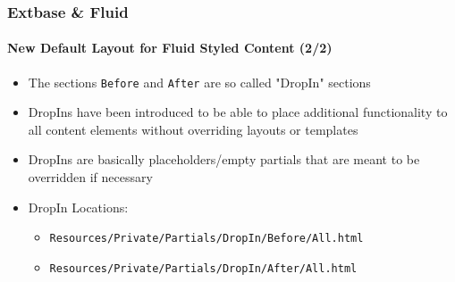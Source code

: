 \begin{frame}[fragile]
	\frametitle{Extbase \& Fluid}
	\framesubtitle{New Default Layout for Fluid Styled Content (2/2)}

	\begin{itemize}
		\item The sections \texttt{Before} and \texttt{After} are so called "DropIn" sections
		\item DropIns have been introduced to be able to place additional functionality to all content
			elements without overriding layouts or templates
		\item DropIns are basically placeholders/empty partials that are meant to be overridden if necessary
		\item DropIn Locations:
			\begin{itemize}
				\item \texttt{Resources/Private/Partials/DropIn/Before/All.html}
				\item \texttt{Resources/Private/Partials/DropIn/After/All.html}
			\end{itemize}
	\end{itemize}

\end{frame}

